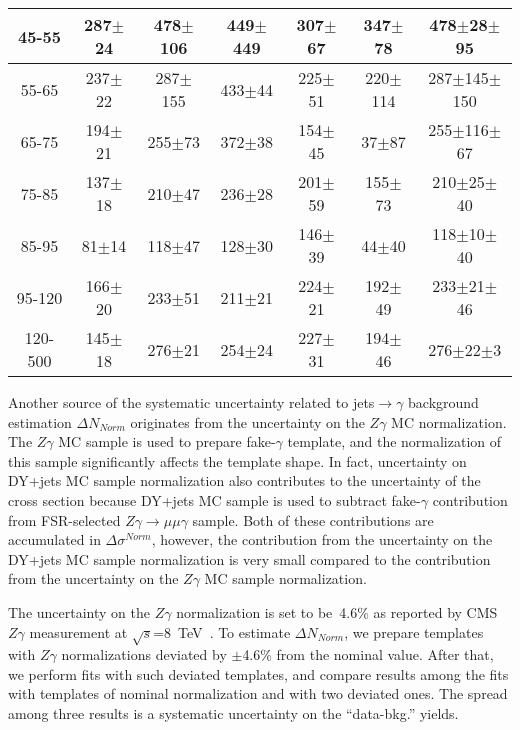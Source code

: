 \begin{table}[h]
\begin{center}
\begin{tabular}{|c|c|c|c|c|c|c|}
    45-55 & 287$\pm$24 & 478$\pm$106 & 449$\pm$449 & 307$\pm$67 & 347$\pm$78 &478$\pm$28$\pm$95  \\ \hline
    55-65 & 237$\pm$22 & 287$\pm$155 & 433$\pm$44 & 225$\pm$51 & 220$\pm$114 &287$\pm$145$\pm$150  \\ \hline
    65-75 & 194$\pm$21 & 255$\pm$73 & 372$\pm$38 & 154$\pm$45 & 37$\pm$87 &255$\pm$116$\pm$67  \\ \hline
    75-85 & 137$\pm$18 & 210$\pm$47 & 236$\pm$28 & 201$\pm$59 & 155$\pm$73 &210$\pm$25$\pm$40  \\ \hline
    85-95 & 81$\pm$14 & 118$\pm$47 & 128$\pm$30 & 146$\pm$39 & 44$\pm$40 &118$\pm$10$\pm$40  \\ \hline
    95-120 & 166$\pm$20 & 233$\pm$51 & 211$\pm$21 & 224$\pm$21 & 192$\pm$49 &233$\pm$21$\pm$46  \\ \hline
    120-500 & 145$\pm$18 & 276$\pm$21 & 254$\pm$24 & 227$\pm$31 & 194$\pm$46 &276$\pm$22$\pm$3  \\ \hline
  \end{tabular}
  \label{tab:diff_ways_to_fit_phoEt_electron}
  \end{center}
\end{table}

Another source of the systematic uncertainty related to jets$\rightarrow\gamma$ background estimation $\Delta N_{Norm}$ originates from the  uncertainty on the $Z\gamma$ MC normalization. The $Z\gamma$ MC sample is used to prepare fake-$\gamma$ template, and the normalization of this sample significantly affects the template shape. In fact, uncertainty on DY+jets MC sample normalization also contributes to the uncertainty of the cross section because DY+jets MC sample is used to subtract fake-$\gamma$ contribution from FSR-selected $Z\gamma\rightarrow\mu\mu\gamma$ sample. Both of these contributions are accumulated in $\Delta \sigma^{Norm}$, however, the contribution from the uncertainty on the DY+jets MC sample normalization is very small compared to the contribution from the uncertainty on the $Z\gamma$ MC sample normalization.  

The uncertainty on the $Z\gamma$ normalization is set to be~4.6\% as reported by CMS $Z\gamma$ measurement at $\sqrt{s}$=8~TeV~\cite{ref_Zg8TeV}. To estimate $\Delta N_{Norm}$, we prepare templates with $Z\gamma$ normalizations deviated by $\pm$4.6\% from the nominal value. After that, we perform fits with such deviated templates, and compare results among the fits with templates of nominal normalization and with two deviated ones. The spread among three results is a systematic uncertainty on the ``data-bkg.'' yields. 

